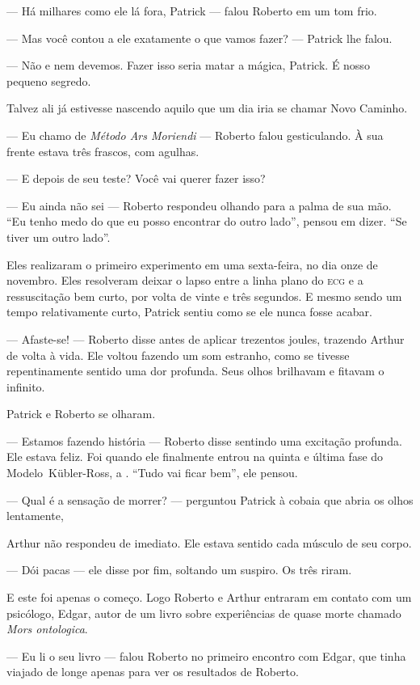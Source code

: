 --- Há milhares como ele lá fora, Patrick --- falou Roberto em um tom frio.

--- Mas você contou a ele exatamente o que vamos fazer? --- Patrick lhe falou.

--- Não e nem devemos. Fazer isso seria matar a mágica, Patrick. É nosso pequeno segredo.

Talvez ali já estivesse nascendo aquilo que um dia iria se chamar Novo Caminho.

--- Eu chamo de \emph{Método Ars Moriendi} --- Roberto falou gesticulando. À sua frente estava três frascos, com agulhas.

--- E depois de seu teste? Você vai querer fazer isso?

--- Eu ainda não sei --- Roberto respondeu olhando para a palma de sua mão. ``Eu tenho medo do que eu posso encontrar do outro lado'', pensou em dizer. ``Se tiver um outro lado''.

Eles realizaram o primeiro experimento em uma sexta-feira, no dia onze de novembro. Eles resolveram deixar o lapso entre a linha plano do \textsc{ecg} e a ressuscitação bem curto, por volta de vinte e três segundos. E mesmo sendo um tempo relativamente curto, Patrick sentiu como se ele nunca fosse acabar.

--- Afaste-se! --- Roberto disse antes de aplicar trezentos joules, trazendo Arthur de volta à vida. Ele voltou fazendo um som estranho, como se tivesse repentinamente sentido uma dor profunda. Seus olhos brilhavam e fitavam o infinito.

Patrick e Roberto se olharam.

--- Estamos fazendo história --- Roberto disse sentindo uma excitação profunda. Ele estava feliz. Foi quando ele finalmente entrou na quinta e última fase do Modelo~Kübler-Ross, a . ``Tudo vai ficar bem'', ele pensou.

--- Qual é a sensação de morrer? --- perguntou Patrick à cobaia que abria os olhos lentamente,

Arthur não respondeu de imediato. Ele estava sentido cada músculo de seu corpo.

--- Dói pacas --- ele disse por fim, soltando um suspiro. Os três riram.

E este foi apenas o começo. Logo Roberto e Arthur entraram em contato com um psicólogo, Edgar, autor de um livro sobre experiências de quase morte chamado \emph{Mors ontologica}.

--- Eu li o seu livro --- falou Roberto no primeiro encontro com Edgar, que tinha viajado de longe apenas para ver os resultados de Roberto.

